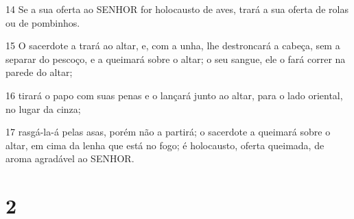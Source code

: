 \par 14 Se a sua oferta ao SENHOR for holocausto de aves, trará a sua oferta de rolas ou de pombinhos.
\par 15 O sacerdote a trará ao altar, e, com a unha, lhe destroncará a cabeça, sem a separar do pescoço, e a queimará sobre o altar; o seu sangue, ele o fará correr na parede do altar;
\par 16 tirará o papo com suas penas e o lançará junto ao altar, para o lado oriental, no lugar da cinza;
\par 17 rasgá-la-á pelas asas, porém não a partirá; o sacerdote a queimará sobre o altar, em cima da lenha que está no fogo; é holocausto, oferta queimada, de aroma agradável ao SENHOR.

\chapter{2}

